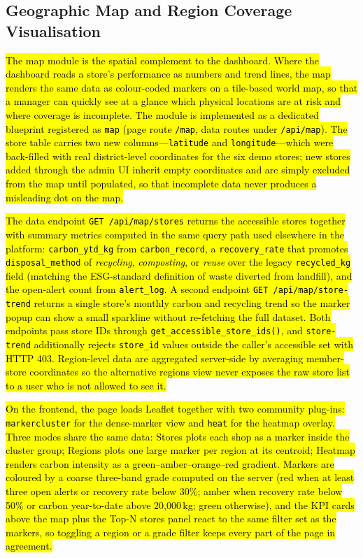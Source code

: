 \documentclass[11pt,a4paper]{article}
\newcommand{\new}[1]{\hl{#1}}
\begin{document}
\subsection{Geographic Map and Region Coverage Visualisation}
\new{The map module is the spatial complement to the dashboard. Where the dashboard reads a store's performance as numbers and trend lines, the map renders the same data as colour-coded markers on a tile-based world map, so that a manager can quickly see at a glance which physical locations are at risk and where coverage is incomplete. The module is implemented as a dedicated blueprint registered as \texttt{map} (page route \texttt{/map}, data routes under \texttt{/api/map}). The store table carries two new columns---\texttt{latitude} and \texttt{longitude}---which were back-filled with real district-level coordinates for the six demo stores; new stores added through the admin UI inherit empty coordinates and are simply excluded from the map until populated, so that incomplete data never produces a misleading dot on the map.}

\new{The data endpoint \texttt{GET /api/map/stores} returns the accessible stores together with summary metrics computed in the same query path used elsewhere in the platform: \texttt{carbon\_ytd\_kg} from \texttt{carbon\_record}, a \texttt{recovery\_rate} that promotes \texttt{disposal\_method} of \emph{recycling}, \emph{composting}, or \emph{reuse} over the legacy \texttt{recycled\_kg} field (matching the ESG-standard definition of waste diverted from landfill), and the open-alert count from \texttt{alert\_log}. A second endpoint \texttt{GET /api/map/store-trend} returns a single store's monthly carbon and recycling trend so the marker popup can show a small sparkline without re-fetching the full dataset. Both endpoints pass store IDs through \texttt{get\_accessible\_store\_ids()}, and \texttt{store-trend} additionally rejects \texttt{store\_id} values outside the caller's accessible set with HTTP 403. Region-level data are aggregated server-side by averaging member-store coordinates so the alternative regions view never exposes the raw store list to a user who is not allowed to see it.}

\new{On the frontend, the page loads Leaflet together with two community plug-ins: \texttt{markercluster} for the dense-marker view and \texttt{heat} for the heatmap overlay. Three modes share the same data: Stores plots each shop as a marker inside the cluster group; Regions plots one large marker per region at its centroid; Heatmap renders carbon intensity as a green--amber--orange--red gradient. Markers are coloured by a coarse three-band grade computed on the server (red when at least three open alerts or recovery rate below 30\%; amber when recovery rate below 50\% or carbon year-to-date above 20{,}000\,kg; green otherwise), and the KPI cards above the map plus the Top-N stores panel react to the same filter set as the markers, so toggling a region or a grade filter keeps every part of the page in agreement.}
\end{document}
